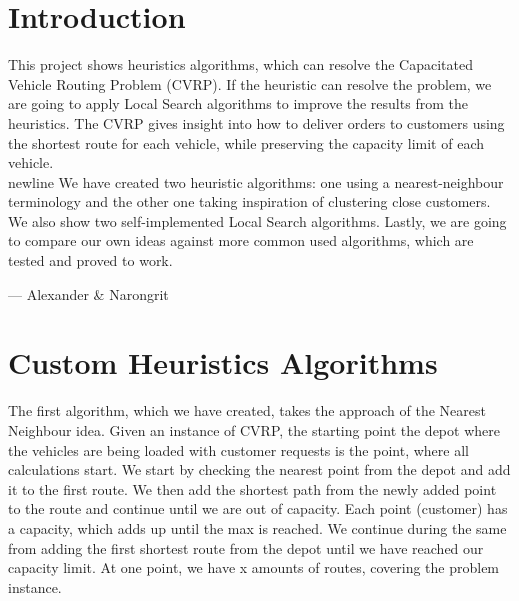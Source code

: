 \documentclass[12pt]{article}
\begin{document}

\tableofcontents
\pagebreak


\section{Introduction}

This project shows heuristics algorithms, which can resolve the Capacitated Vehicle Routing Problem (CVRP). If the heuristic can resolve the problem, we are going to apply Local Search algorithms to improve the results from the heuristics. 
The CVRP gives insight into how to deliver orders to customers using the shortest route for each vehicle, while preserving the capacity limit of each vehicle.\\newline
We have created two heuristic algorithms: one using a nearest-neighbour terminology and the other one taking inspiration of clustering close customers. We also show two self-implemented Local Search algorithms. 
Lastly, we are going to compare our own ideas against more common used algorithms, which are tested and proved to work. 

\hspace{1 cm}--- Alexander \& Narongrit

\newpage

\section{Custom Heuristics Algorithms} 


The first algorithm, which we have created, takes the approach of the Nearest Neighbour idea. Given an instance of CVRP, the starting point \- the depot where the vehicles are being loaded with customer requests \- is the point, where all calculations start. 
We start by checking the nearest point from the depot and add it to the first route. We then add the shortest path from the newly added point to the route and continue until we are out of capacity. Each point (customer) has a capacity, which adds up until the max is reached. We continue during the same from adding the first shortest route from the depot until we have reached our capacity limit. At one point, we have x amounts of routes, covering the problem instance. 
\newline
\end{document}
